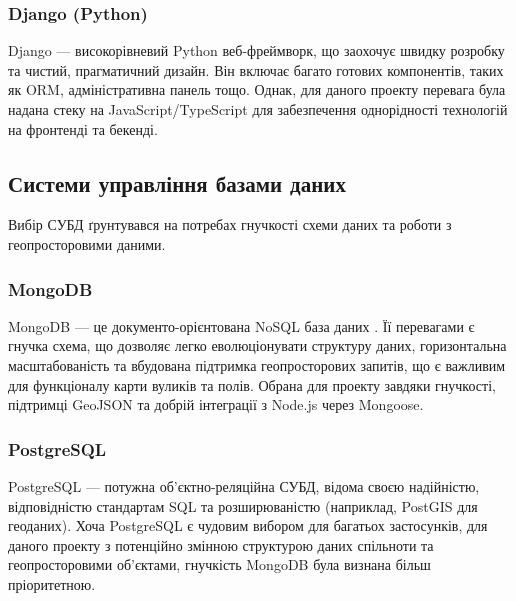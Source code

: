 \subsubsection{Django (Python)}
Django — високорівневий Python веб-фреймворк, що заохочує швидку розробку та чистий, прагматичний дизайн. Він включає багато готових компонентів, таких як ORM, адміністративна панель тощо. Однак, для даного проекту перевага була надана стеку на JavaScript/TypeScript для забезпечення однорідності технологій на фронтенді та бекенді.

\subsection{Системи управління базами даних}
Вибір СУБД ґрунтувався на потребах гнучкості схеми даних та роботи з геопросторовими даними.
\subsubsection{MongoDB}
MongoDB — це документо-орієнтована NoSQL база даних \cite{mongodb}. Її перевагами є гнучка схема, що дозволяє легко еволюціонувати структуру даних, горизонтальна масштабованість та вбудована підтримка геопросторових запитів, що є важливим для функціоналу карти вуликів та полів. Обрана для проекту завдяки гнучкості, підтримці GeoJSON та добрій інтеграції з Node.js через Mongoose.

\subsubsection{PostgreSQL}
PostgreSQL — потужна об'єктно-реляційна СУБД, відома своєю надійністю, відповідністю стандартам SQL та розширюваністю (наприклад, PostGIS для геоданих). Хоча PostgreSQL є чудовим вибором для багатьох застосунків, для даного проекту з потенційно змінною структурою даних спільноти та геопросторовими об'єктами, гнучкість MongoDB була визнана більш пріоритетною.

